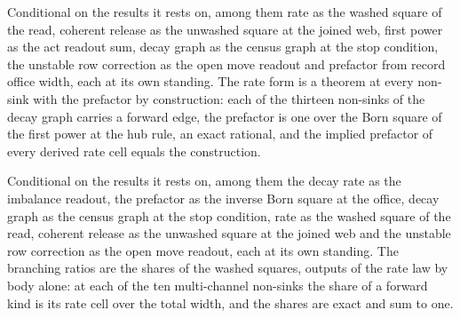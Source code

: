 \begin{chconditional}\label{box:IX-2-rate-as-the-washed-square-of-the-read-and-the-tick-unit:3}
Conditional on the results it rests on, among them rate as the washed square of the read, coherent release as the unwashed square at the joined web, first power as the act readout sum, decay graph as the census graph at the stop condition, the unstable row correction as the open move readout and prefactor from record office width, each at its own standing. The rate form is a theorem at every non-sink with the prefactor by construction: each of the thirteen non-sinks of the decay graph carries a forward edge, the prefactor is one over the Born square of the first power at the hub rule, an exact rational, and the implied prefactor of every derived rate cell equals the construction.
\end{chconditional}
\begin{chconditional}\label{box:IX-2-rate-as-the-washed-square-of-the-read-and-the-tick-unit:4}
Conditional on the results it rests on, among them the decay rate as the imbalance readout, the prefactor as the inverse Born square at the office, decay graph as the census graph at the stop condition, rate as the washed square of the read, coherent release as the unwashed square at the joined web and the unstable row correction as the open move readout, each at its own standing. The branching ratios are the shares of the washed squares, outputs of the rate law by body alone: at each of the ten multi-channel non-sinks the share of a forward kind is its rate cell over the total width, and the shares are exact and sum to one.
\end{chconditional}
